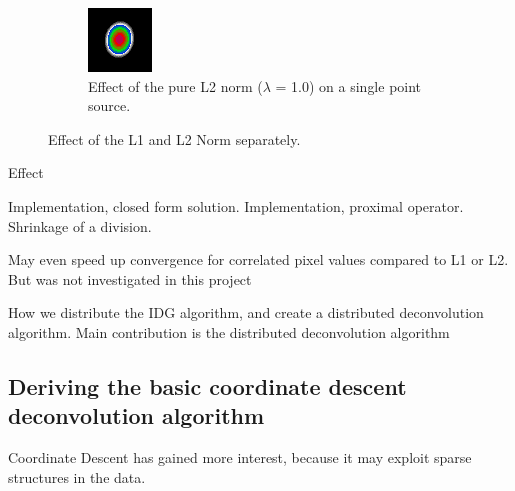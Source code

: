 \begin{figure}[h]
\begin{subfigure}[b]{0.3\linewidth}
		\includegraphics[width=\linewidth]{./chapters/03.distribution/L2.png}
		\caption{Effect of the pure L2 norm ($\lambda$ = 1.0) on a single point source.}
		\label{dist:cd:elastic:L2}
	\end{subfigure}
	
	\caption{Effect of the L1 and L2 Norm separately.}
	\label{dist:cd:elastic}
\end{figure}


Effect

Implementation, closed form solution.
Implementation, proximal operator. Shrinkage of a division.



May even speed up convergence for correlated pixel values compared to L1 or L2\cite{friedman2010regularization}. But was not investigated in this project


How we distribute the IDG algorithm, and create a distributed deconvolution algorithm. Main contribution is the distributed deconvolution algorithm


\subsection{Deriving the basic coordinate descent deconvolution algorithm}\label{cd:deriving}
Coordinate Descent has gained more interest, because it may exploit sparse structures in the data.

